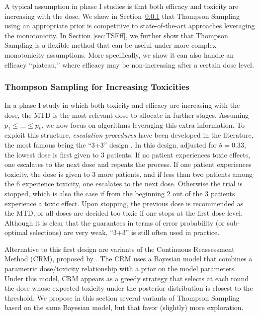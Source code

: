 A typical assumption in phase I studies is that both efficacy and toxicity are increasing with the dose. We show in Section~\ref{sec:TSIncreasing} that Thompson Sampling using an appropriate prior is competitive to state-of-the-art approaches leveraging the monotonicity. In Section \ref{sec:TSEff}, we further show that Thompson Sampling is a flexible method that can be useful under more complex monotonicity assumptions. More specifically, we show it can also handle an efficacy ``plateau,'' where efficacy may be non-increasing after a certain dose level.   

\subsubsection{Thompson Sampling for Increasing Toxicities}\label{sec:TSIncreasing}

In a phase I study in which both toxicity and efficacy are increasing with the dose, the MTD is the most relevant dose to allocate in further stages. Assuming $p_1 \leq \dots \leq p_k$, we now focus on algorithms leveraging this extra information. 
To exploit this structure, \emph{escalation procedures} have been developed in the literature, the most famous being the ``3+3'' design \cite{storer89}. In this design, adjusted for $\theta = 0.33$, the lowest dose is first given to 3 patients. If no patient experiences toxic effects, one escalates to the next dose and repeats the process. If one patient experiences toxicity, the dose is given to 3 more patients, and if less than two patients among the 6 experience toxicity, one escalates to the next dose. Otherwise the trial is stopped, which is also the case if from the beginning 2 out of the 3 patients experience a toxic effect. Upon stopping, the previous dose is recommended as the MTD, or all doses are decided too toxic if one stops at the first dose level. Although it is clear that the guarantees in terms of error probability (or sub-optimal selections) are very weak, ``3+3'' is still often used in practice.

Alternative to this first design are variants of the Continuous Reassessment Method (CRM), proposed by \cite{OQuigley90CRM}. The CRM uses a Bayesian model that combines a parametric dose/toxicity relationship with a prior on the model parameters. Under this model, CRM appears as a greedy strategy that selects at each round the dose whose expected toxicity under the posterior distribution is closest to the threshold. We propose in this section several variants of Thompson Sampling based on the same Bayesian model, but that favor (slightly) more exploration. 

